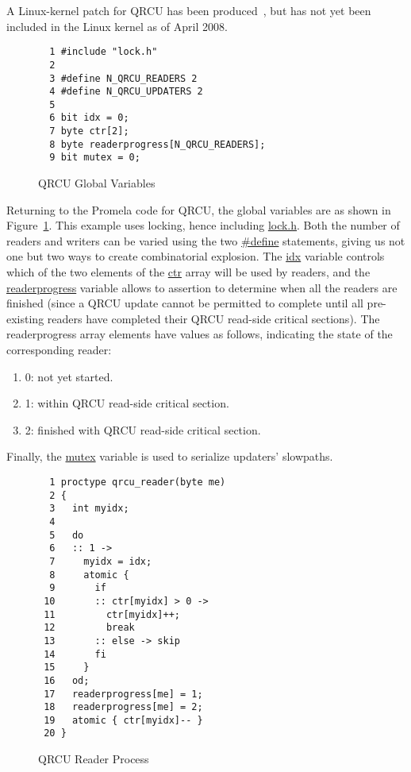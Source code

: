 A Linux-kernel patch for QRCU has been
produced~\cite{PaulMcKenney2007QRCUpatch},
but has not yet been included in the Linux kernel as of
April 2008.

\begin{figure}[htbp]
{ %
\begin{verbatim}
  1 #include "lock.h"
  2
  3 #define N_QRCU_READERS 2
  4 #define N_QRCU_UPDATERS 2
  5
  6 bit idx = 0;
  7 byte ctr[2];
  8 byte readerprogress[N_QRCU_READERS];
  9 bit mutex = 0;
\end{verbatim}
}
\caption{QRCU Global Variables}
\label{fig:analysis:QRCU Global Variables}
\end{figure}

Returning to the Promela code for QRCU, the global variables are as shown in
Figure~\ref{fig:analysis:QRCU Global Variables}.
This example uses locking, hence including \url{lock.h}.
Both the number of readers and writers can be varied using the
two \url{#define} statements, giving us not one but two ways to create
combinatorial explosion.
The \url{idx} variable controls which of the two elements of the \url{ctr}
array will be used by readers, and the \url{readerprogress} variable
allows to assertion to determine when all the readers are finished
(since a QRCU update cannot be permitted to complete until all
pre-existing readers have completed their QRCU read-side critical
sections).
The readerprogress array elements have values as follows,
indicating the state of the corresponding reader:

\begin{enumerate}
\item	0: not yet started.
\item	1: within QRCU read-side critical section.
\item	2: finished with QRCU read-side critical section.
\end{enumerate}

Finally, the \url{mutex} variable is used to serialize updaters' slowpaths.

\begin{figure}[htbp]
{ %
\begin{verbatim}
  1 proctype qrcu_reader(byte me)
  2 {
  3   int myidx;
  4
  5   do
  6   :: 1 ->
  7     myidx = idx;
  8     atomic {
  9       if
 10       :: ctr[myidx] > 0 ->
 11         ctr[myidx]++;
 12         break
 13       :: else -> skip
 14       fi
 15     }
 16   od;
 17   readerprogress[me] = 1;
 18   readerprogress[me] = 2;
 19   atomic { ctr[myidx]-- }
 20 }
\end{verbatim}
}
\caption{QRCU Reader Process}
\label{fig:analysis:QRCU Reader Process}
\end{figure}

